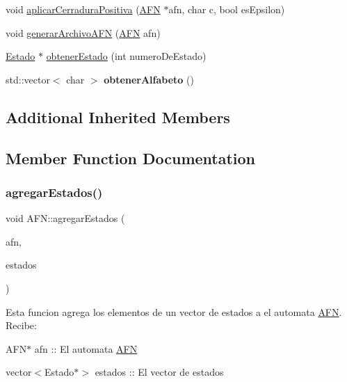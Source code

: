 \begin{DoxyCompactItemize}
\item 
void \hyperlink{class_a_f_n_a7341086a00410a1a6a2ba4262a10d249}{aplicar\+Cerradura\+Positiva} (\hyperlink{class_a_f_n}{A\+FN} $\ast$afn, char c, bool es\+Epsilon)
\item 
void \hyperlink{class_a_f_n_a12af101cefe7072f22f9bd52442c4167}{generar\+Archivo\+A\+FN} (\hyperlink{class_a_f_n}{A\+FN} afn)
\item 
\hyperlink{class_estado}{Estado} $\ast$ \hyperlink{class_a_f_n_af6cb39f268a7722d65452b790349211d}{obtener\+Estado} (int numero\+De\+Estado)
\item 
\mbox{\label{class_a_f_n_afa47c783d422d46161fe02266f65c861}} 
std\+::vector$<$ char $>$ {\bfseries obtener\+Alfabeto} ()
\end{DoxyCompactItemize}
\subsection*{Additional Inherited Members}


\subsection{Member Function Documentation}
\mbox{\label{class_a_f_n_a565f890649af177b45ad4111ad0d14ec}} 
\subsubsection{\texorpdfstring{agregar\+Estados()}{agregarEstados()}}
{\footnotesize\ttfamily void A\+F\+N\+::agregar\+Estados (\begin{DoxyParamCaption}\item[{\hyperlink{class_a_f_n}{A\+FN} $\ast$}]{afn,  }\item[{std\+::vector$<$ \hyperlink{class_estado}{Estado} $\ast$$>$}]{estados }\end{DoxyParamCaption})}

Esta funcion agrega los elementos de un vector de estados a el automata \hyperlink{class_a_f_n}{A\+FN}. Recibe\+:
\begin{DoxyItemize}
\item A\+F\+N$\ast$ afn \+:\+: El automata \hyperlink{class_a_f_n}{A\+FN}
\item vector$<$\+Estado$\ast$$>$ estados \+:\+: El vector de estados 
\end{DoxyItemize}\mbox{\label{class_a_f_n_ac4e76a6828f9e227ed460d2e75a3a965}} 
